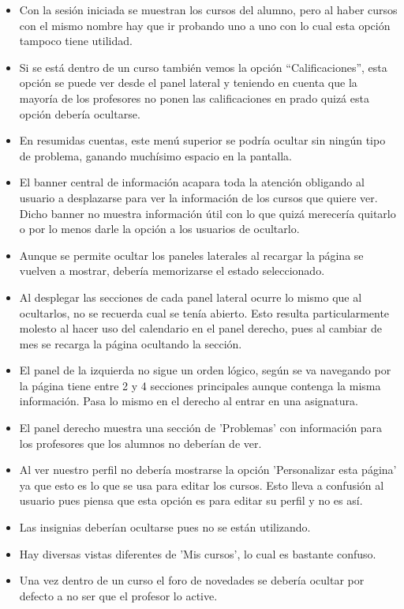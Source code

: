 \begin{itemize}
\item Con la sesión iniciada se muestran los cursos del alumno, pero al haber cursos con el mismo nombre hay que ir probando uno a uno con lo cual esta opción tampoco tiene utilidad.
\item Si se está dentro de un curso también vemos la opción ``Calificaciones'', esta opción se puede ver desde el panel lateral y teniendo en cuenta que la mayoría de los profesores no ponen las calificaciones en prado quizá esta opción debería ocultarse.
\item En resumidas cuentas, este menú superior se podría ocultar sin ningún tipo de problema, ganando muchísimo espacio en la pantalla.
\item El banner central de información acapara toda la atención obligando al usuario a desplazarse para ver la información de los cursos que quiere ver. Dicho banner no muestra información útil con lo que quizá merecería quitarlo o por lo menos darle la opción a los usuarios de ocultarlo.
\item Aunque se permite ocultar los paneles laterales al recargar la página se vuelven a mostrar, debería memorizarse el estado seleccionado.
\item Al desplegar las secciones de cada panel lateral ocurre lo mismo que al ocultarlos, no se recuerda cual se tenía abierto. Esto resulta particularmente molesto al hacer uso del calendario en el panel derecho, pues al cambiar de mes se recarga la página ocultando la sección.
\item El panel de la izquierda no sigue un orden lógico, según se va navegando por la página tiene entre 2 y 4 secciones principales aunque contenga la misma información. Pasa lo mismo en el derecho al entrar en una asignatura.
\item El panel derecho muestra una sección de 'Problemas' con información para los profesores que los alumnos no deberían de ver.
\item Al ver nuestro perfil no debería mostrarse la opción 'Personalizar esta página' ya que esto es lo que se usa para editar los cursos. Esto lleva a confusión al usuario pues piensa que esta opción es para editar su perfil y no es así.
\item Las insignias deberían ocultarse pues no se están utilizando.
\item Hay diversas vistas diferentes de 'Mis cursos', lo cual es bastante confuso.
\item Una vez dentro de un curso el foro de novedades se debería ocultar por defecto a no ser que el profesor lo active.

\end{itemize}
